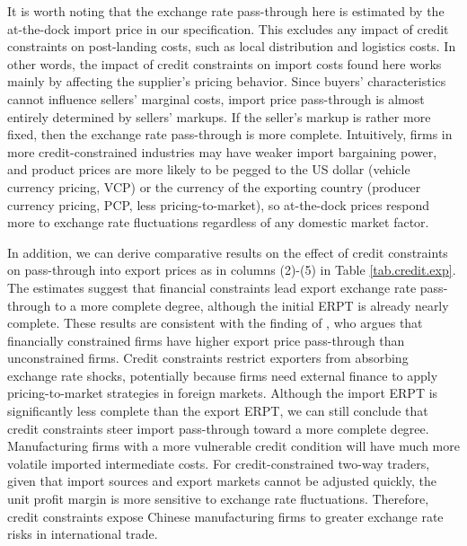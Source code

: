 It is worth noting that the exchange rate pass-through here is estimated by the at-the-dock import price in our specification. This excludes any impact of credit constraints on post-landing costs, such as local distribution and logistics costs. In other words, the impact of credit constraints on import costs found here works mainly by affecting the supplier's pricing behavior. Since buyers' characteristics cannot influence sellers' marginal costs, import price pass-through is almost entirely determined by sellers' markups. If the seller's markup is rather more fixed, then the exchange rate pass-through is more complete. Intuitively, firms in more credit-constrained industries may have weaker import bargaining power, and product prices are more likely to be pegged to the US dollar (vehicle currency pricing, VCP) or the currency of the exporting country (producer currency pricing, PCP, less pricing-to-market), so at-the-dock prices respond more to exchange rate fluctuations regardless of any domestic market factor.

In addition, we can derive comparative results on the effect of credit constraints on pass-through into export prices as in columns (2)-(5) in Table \ref{tab.credit.exp}. The estimates suggest that financial constraints lead export exchange rate pass-through to a more complete degree, although the initial ERPT is already nearly complete. These results are consistent with the finding of \cite{strasser2013}, who argues that financially constrained firms have higher export price pass-through than unconstrained firms. Credit constraints restrict exporters from absorbing exchange rate shocks, potentially because firms need external finance to apply pricing-to-market strategies in foreign markets. Although the import ERPT is significantly less complete than the export ERPT, we can still conclude that credit constraints steer import pass-through toward a more complete degree. Manufacturing firms with a more vulnerable credit condition will have much more volatile imported intermediate costs. For credit-constrained two-way traders, given that import sources and export markets cannot be adjusted quickly, the unit profit margin is more sensitive to exchange rate fluctuations. Therefore, credit constraints expose Chinese manufacturing firms to greater exchange rate risks in international trade.

